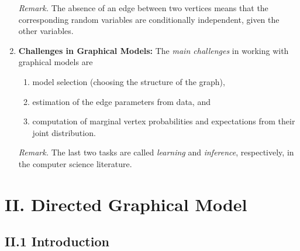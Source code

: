 \documentclass[12pt]{article}
\begin{document}
\begin{enumerate}[label=\textbf{\arabic*.}]
	\textit{Remark.} The absence of an edge between two vertices means that the corresponding random variables are conditionally independent, given the other variables.  
	
	\item \textbf{Challenges in Graphical Models:} The \textit{main challenges} in working with graphical models are 
	\begin{enumerate}
		\item model selection (choosing the structure of the graph), 
		\item estimation of the edge parameters from data, and 
		\item computation of marginal vertex probabilities and expectations from their joint distribution.
	\end{enumerate}
	
	\textit{Remark.} The last two tasks are called \emph{learning} and \emph{inference}, respectively, in the computer science literature. 
	
\end{enumerate}


\section*{II. Directed Graphical Model}

\subsection*{II.1 Introduction}
\end{document}
